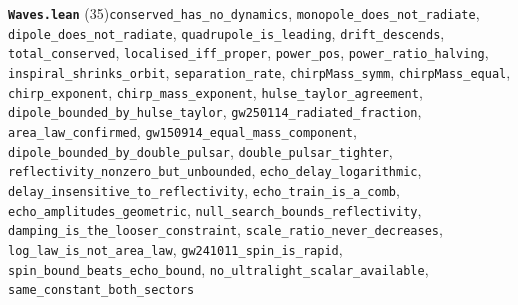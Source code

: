 \documentclass[11pt,a4paper]{article}
\theoremstyle{sudef}
\begin{document}
\noindent\textbf{\texttt{Waves.lean}} (35)\quad \texttt{conserved\_\allowbreak has\_\allowbreak no\_\allowbreak dynamics}, \texttt{monopole\_\allowbreak does\_\allowbreak not\_\allowbreak radiate}, \texttt{dipole\_\allowbreak does\_\allowbreak not\_\allowbreak radiate}, \texttt{quadrupole\_\allowbreak is\_\allowbreak leading}, \texttt{drift\_\allowbreak descends}, \texttt{total\_\allowbreak conserved}, \texttt{localised\_\allowbreak iff\_\allowbreak proper}, \texttt{power\_\allowbreak pos}, \texttt{power\_\allowbreak ratio\_\allowbreak halving}, \texttt{inspiral\_\allowbreak shrinks\_\allowbreak orbit}, \texttt{separation\_\allowbreak rate}, \texttt{chirpMass\_\allowbreak symm}, \texttt{chirpMass\_\allowbreak equal}, \texttt{chirp\_\allowbreak exponent}, \texttt{chirp\_\allowbreak mass\_\allowbreak exponent}, \texttt{hulse\_\allowbreak taylor\_\allowbreak agreement}, \texttt{dipole\_\allowbreak bounded\_\allowbreak by\_\allowbreak hulse\_\allowbreak taylor}, \texttt{gw250114\_\allowbreak radiated\_\allowbreak fraction}, \texttt{area\_\allowbreak law\_\allowbreak confirmed}, \texttt{gw150914\_\allowbreak equal\_\allowbreak mass\_\allowbreak component}, \texttt{dipole\_\allowbreak bounded\_\allowbreak by\_\allowbreak double\_\allowbreak pulsar}, \texttt{double\_\allowbreak pulsar\_\allowbreak tighter}, \texttt{reflectivity\_\allowbreak nonzero\_\allowbreak but\_\allowbreak unbounded}, \texttt{echo\_\allowbreak delay\_\allowbreak logarithmic}, \texttt{delay\_\allowbreak insensitive\_\allowbreak to\_\allowbreak reflectivity}, \texttt{echo\_\allowbreak train\_\allowbreak is\_\allowbreak a\_\allowbreak comb}, \texttt{echo\_\allowbreak amplitudes\_\allowbreak geometric}, \texttt{null\_\allowbreak search\_\allowbreak bounds\_\allowbreak reflectivity}, \texttt{damping\_\allowbreak is\_\allowbreak the\_\allowbreak looser\_\allowbreak constraint}, \texttt{scale\_\allowbreak ratio\_\allowbreak never\_\allowbreak decreases}, \texttt{log\_\allowbreak law\_\allowbreak is\_\allowbreak not\_\allowbreak area\_\allowbreak law}, \texttt{gw241011\_\allowbreak spin\_\allowbreak is\_\allowbreak rapid}, \texttt{spin\_\allowbreak bound\_\allowbreak beats\_\allowbreak echo\_\allowbreak bound}, \texttt{no\_\allowbreak ultralight\_\allowbreak scalar\_\allowbreak available}, \texttt{same\_\allowbreak constant\_\allowbreak both\_\allowbreak sectors}\par\smallskip
\end{document}

